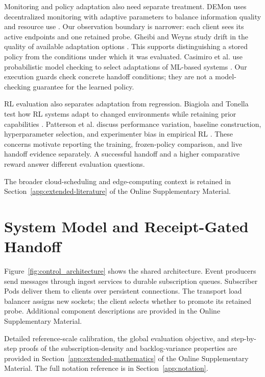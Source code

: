 
Monitoring and policy adaptation also need separate treatment. DEMon uses
decentralized monitoring with adaptive parameters to balance information
quality and resource use \cite{Ilager2026DEMon}. Our observation boundary is
narrower: each client sees its active endpoints and one retained probe.
Gheibi and Weyns study drift in the quality of available adaptation options
\cite{Gheibi2024AdaptationDrift}. This supports distinguishing a stored policy
from the conditions under which it was evaluated. Casimiro et al. use
probabilistic model checking to select adaptations of ML-based systems
\cite{Casimiro2024ModelChecking}. Our execution guards check concrete handoff
conditions; they are not a model-checking guarantee for the learned policy.


RL evaluation also separates adaptation from regression. Biagiola and Tonella
test how RL systems adapt to changed environments while retaining prior
capabilities \cite{Biagiola2022Plasticity}. Patterson et al. discuss performance
variation, baseline construction, hyperparameter selection, and experimenter
bias in empirical RL \cite{Patterson2024EmpiricalDesign}. These concerns motivate
reporting the training, frozen-policy comparison, and live handoff evidence
separately. A successful handoff and a higher comparative reward answer
different evaluation questions.


The broader cloud-scheduling and edge-computing context is retained in
Section~\ref{app:extended-literature} of the Online Supplementary Material.

\section{System Model and Receipt-Gated Handoff}
Figure~\ref{fig:control_architecture} shows the shared architecture. Event
producers send messages through ingest services to durable subscription queues.
Subscriber Pods deliver them to clients over persistent connections. The
transport load balancer assigns new sockets; the client selects whether to
promote its retained probe. Additional component descriptions are provided in
the Online Supplementary Material.

Detailed reference-scale calibration, the global evaluation objective, and
step-by-step proofs of the subscription-density and backlog-variance
properties are provided in Section~\ref{app:extended-mathematics} of the Online
Supplementary Material. The full notation reference is in
Section~\ref{app:notation}.

